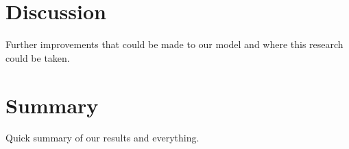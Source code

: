 \documentclass[12pt, draft]{article}
\begin{document}
\section{Discussion}

Further improvements that could be made to our model and where this research could be taken.

\section{Summary}

Quick summary of our results and everything.





\end{document}
